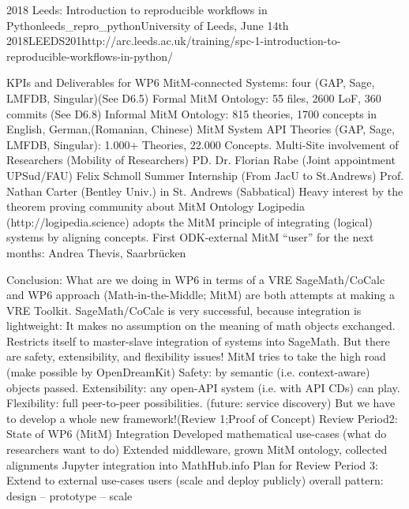 \begin{Aim 1}
\begin{Aim 2}
\begin{event}{2018 Leeds: Introduction to reproducible workflows in Python}{leeds_repro_python}{University of Leeds, June 14th 2018}{LEEDS}{20}{1}{http://arc.leeds.ac.uk/training/spc-1-introduction-to-reproducible-workflows-in-python/}
\begin{itemize}
KPIs and Deliverables for WP6
MitM-connected Systems: four (GAP, Sage, LMFDB, Singular)(See D6.5)
Formal MitM Ontology: 55 files, 2600 LoF, 360 commits (See D6.8)
Informal MitM Ontology: 815 theories, 1700 concepts in English, German,(Romanian, Chinese)
MitM System API Theories (GAP, Sage, LMFDB, Singular): 1.000+ Theories, 22.000 Concepts.
Multi-Site involvement of Researchers (Mobility of Researchers)
PD. Dr. Florian Rabe (Joint appointment UPSud/FAU)
Felix Schmoll Summer Internship (From JacU to St.Andrews)
Prof. Nathan Carter (Bentley Univ.) in St. Andrews (Sabbatical)
Heavy interest by the theorem proving community about MitM Ontology
Logipedia (http://logipedia.science) adopts the MitM principle of integrating (logical) systems by aligning concepts.
First ODK-external MitM “user” for the next months: Andrea Thevis, Saarbrücken 

Conclusion: What are we doing in WP6 in terms of a VRE
SageMath/CoCalc and WP6 approach (Math-in-the-Middle; MitM) are both attempts at making a VRE Toolkit.
SageMath/CoCalc is very successful, because integration is lightweight:
It makes no assumption on the meaning of math objects exchanged.
Restricts itself to master-slave integration of systems into SageMath.
But there are safety, extensibility, and flexibility issues!
MitM tries to take the high road (make possible by OpenDreamKit)
Safety: by semantic (i.e. context-aware) objects passed.
Extensibility: any open-API system (i.e. with API CDs) can play.
Flexibility: full peer-to-peer possibilities.
(future: service discovery)
But we have to develop a whole new framework!(Review 1;Proof of Concept)
Review Period2: State of WP6 (MitM) Integration
Developed mathematical use-cases (what do researchers want to do)
Extended middleware, grown MitM ontology, collected alignments
Jupyter integration into MathHub.info
Plan for Review Period 3: Extend to external use-cases users  (scale and deploy publicly)
overall pattern: design – prototype – scale


\end{itemize}
\end{event}
\end{Aim 2}
\end{Aim 1}
